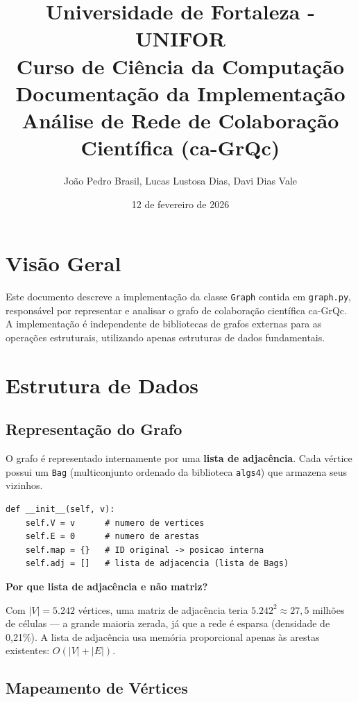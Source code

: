 \documentclass[12pt,a4paper]{article}
\title{
    \Large\textbf{Universidade de Fortaleza - UNIFOR}\\
    \large Curso de Ciência da Computação\\
    \vspace{1.5cm}
    \huge\textbf{Documentação da Implementação}\\
    \large Análise de Rede de Colaboração Científica (ca-GrQc)
}
\author{João Pedro Brasil, Lucas Lustosa Dias, Davi Dias Vale}
\date{12 de fevereiro de 2026}
\begin{document}
\maketitle
\thispagestyle{empty}
\newpage

\tableofcontents
\newpage

\section{Visão Geral}

Este documento descreve a implementação da classe \texttt{Graph} contida em \texttt{graph.py}, responsável por representar e analisar o grafo de colaboração científica ca-GrQc. A implementação é independente de bibliotecas de grafos externas para as operações estruturais, utilizando apenas estruturas de dados fundamentais.

\section{Estrutura de Dados}

\subsection{Representação do Grafo}

O grafo é representado internamente por uma \textbf{lista de adjacência}. Cada vértice possui um \texttt{Bag} (multiconjunto ordenado da biblioteca \texttt{algs4}) que armazena seus vizinhos.

\begin{lstlisting}
def __init__(self, v):
    self.V = v      # numero de vertices
    self.E = 0      # numero de arestas
    self.map = {}   # ID original -> posicao interna
    self.adj = []   # lista de adjacencia (lista de Bags)
\end{lstlisting}

\textbf{Por que lista de adjacência e não matriz?}

Com $|V| = 5.242$ vértices, uma matriz de adjacência teria $5.242^2 \approx 27,5$ milhões de células — a grande maioria zerada, já que a rede é esparsa (densidade de 0,21\%). A lista de adjacência usa memória proporcional apenas às arestas existentes: $O(|V| + |E|)$.

\subsection{Mapeamento de Vértices}
\end{document}
